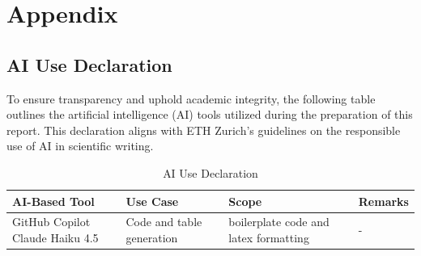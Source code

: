 \appendix
\section{Appendix}
\label{appendix}
\subsection{AI Use Declaration}
To ensure transparency and uphold academic integrity, the following table outlines the artificial intelligence (AI) tools utilized during the preparation of this report. This declaration aligns with ETH Zurich's guidelines on the responsible use of AI in scientific writing.

\begin{table}[h!]
    \centering
    \caption{AI Use Declaration}
    \label{tab:ai_use_declaration}
    \begin{tabular}{@{}p{3.5cm} p{2.5cm} p{2.5cm} p{6cm}@{}}
        \toprule
        \textbf{AI-Based Tool} & \textbf{Use Case} & \textbf{Scope} & \textbf{Remarks} \\ \midrule
        GitHub Copilot Claude Haiku 4.5 \newline  & Code and table generation & boilerplate code and latex formatting & -  \\ \midrule
    \end{tabular}
\end{table}
